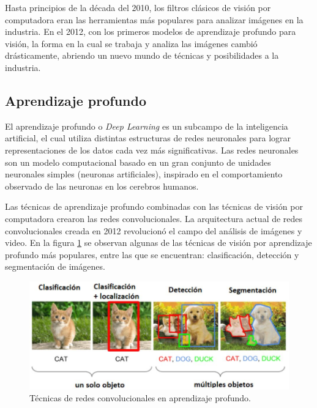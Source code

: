 

Hasta principios de la década del 2010, los filtros clásicos de visión por computadora eran las herramientas más populares para analizar imágenes en la industria. En el 2012, con los primeros modelos de aprendizaje profundo para visión, la forma en la cual se trabaja y analiza las imágenes cambió drásticamente, abriendo un nuevo mundo de técnicas y posibilidades a la industria.

\newpage

\subsection{Aprendizaje profundo}

El aprendizaje profundo o \textit{Deep Learning} \citep{DEEP_LEARNING} es un subcampo de la inteligencia artificial, el cual utiliza distintas estructuras de redes neuronales para lograr representaciones de los datos cada vez más significativas. Las redes neuronales son un modelo computacional basado en un gran conjunto de unidades neuronales simples (neuronas artificiales), inspirado en el comportamiento observado de las neuronas en los cerebros humanos. 

Las técnicas de aprendizaje profundo combinadas con las técnicas de visión por computadora crearon las redes convolucionales. La arquitectura actual de redes convolucionales creada en 2012 revolucionó el campo del análisis de imágenes y video. En la figura \ref{fig:visionDeepLearning} se observan algunas de las técnicas de visión por aprendizaje profundo más populares, entre las que se encuentran: clasificación, detección y segmentación de imágenes.

\begin{figure}[ht]
	\centering
	\includegraphics[scale=.7]{./Figures/visionDeepLearning.jpg}
	\caption{Técnicas de redes convolucionales en aprendizaje profundo\protect\footnotemark.}
	\label{fig:visionDeepLearning}
\end{figure}

